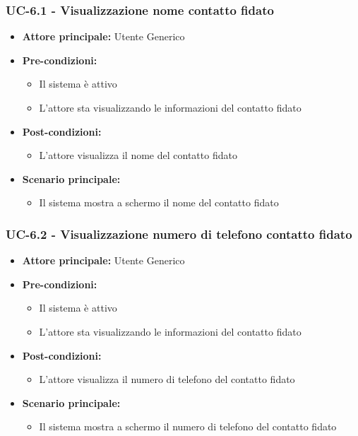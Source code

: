 \documentclass[a4paper,12pt]{article}
\begin{document}
\subsubsection{UC-6.1 - Visualizzazione nome contatto fidato} \label{subsec:UC-6.1}
\begin{itemize}
    \item \textbf{Attore principale:} Utente Generico
    \item \textbf{Pre-condizioni:} 
    \begin{itemize}
        \item Il sistema è attivo
        \item L'attore sta visualizzando le informazioni del contatto fidato
    \end{itemize}
    \item \textbf{Post-condizioni:}
    \begin{itemize}
        \item L'attore visualizza il nome del contatto fidato
    \end{itemize}
    \item \textbf{Scenario principale:} 
    \begin{itemize}
        \item Il sistema mostra a schermo il nome del contatto fidato
    \end{itemize}
\end{itemize}

\subsubsection{UC-6.2 - Visualizzazione numero di telefono contatto fidato} \label{subsec:UC-6.2}
\begin{itemize}
    \item \textbf{Attore principale:} Utente Generico
    \item \textbf{Pre-condizioni:} 
    \begin{itemize}
        \item Il sistema è attivo
        \item L'attore sta visualizzando le informazioni del contatto fidato
    \end{itemize}
    \item \textbf{Post-condizioni:}
    \begin{itemize}
        \item L'attore visualizza il numero di telefono del contatto fidato
    \end{itemize}
    \item \textbf{Scenario principale:} 
    \begin{itemize}
        \item Il sistema mostra a schermo il numero di telefono del contatto fidato
    \end{itemize}
\end{itemize}
\end{document}
